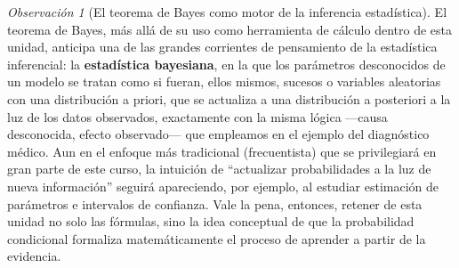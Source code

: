 \documentclass[11pt,a4paper]{article}
\theoremstyle{plain}
\theoremstyle{definition}
\theoremstyle{remark}
\newtheorem{observacion}[teorema]{Observación}
\begin{document}
\begin{observacion}[El teorema de Bayes como motor de la inferencia estadística]
El teorema de Bayes, más allá de su uso como herramienta de cálculo dentro de esta unidad, anticipa una de las grandes corrientes de pensamiento de la estadística inferencial: la \textbf{estadística bayesiana}, en la que los parámetros desconocidos de un modelo se tratan como si fueran, ellos mismos, sucesos o variables aleatorias con una distribución a priori, que se actualiza a una distribución a posteriori a la luz de los datos observados, exactamente con la misma lógica —causa desconocida, efecto observado— que empleamos en el ejemplo del diagnóstico médico. Aun en el enfoque más tradicional (frecuentista) que se privilegiará en gran parte de este curso, la intuición de ``actualizar probabilidades a la luz de nueva información'' seguirá apareciendo, por ejemplo, al estudiar estimación de parámetros e intervalos de confianza. Vale la pena, entonces, retener de esta unidad no solo las fórmulas, sino la idea conceptual de que la probabilidad condicional formaliza matemáticamente el proceso de aprender a partir de la evidencia.
\end{observacion}
\end{document}
